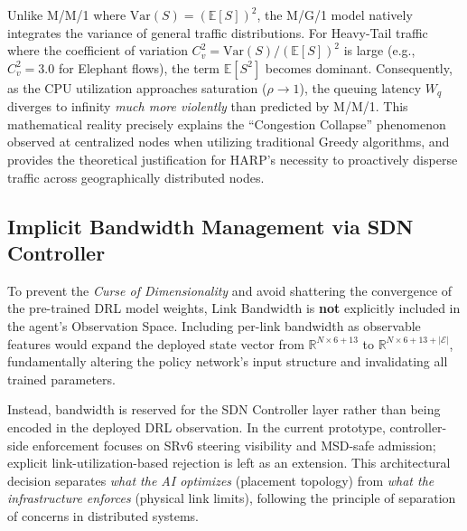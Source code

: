 \documentclass[12pt, a4paper, reqno, oneside]{book}
\begin{document}
Unlike M/M/1 where $\text{Var}(S) = (\mathbb{E}[S])^2$, the M/G/1 model natively integrates the variance of general traffic distributions. For Heavy-Tail traffic where the coefficient of variation $C_v^2 = \text{Var}(S)/(\mathbb{E}[S])^2$ is large (e.g., $C_v^2 = 3.0$ for Elephant flows), the term $\mathbb{E}[S^2]$ becomes dominant. Consequently, as the CPU utilization approaches saturation ($\rho \to 1$), the queuing latency $W_q$ diverges to infinity \textit{much more violently} than predicted by M/M/1. This mathematical reality precisely explains the ``Congestion Collapse'' phenomenon observed at centralized nodes when utilizing traditional Greedy algorithms, and provides the theoretical justification for HARP's necessity to proactively disperse traffic across geographically distributed nodes.

\subsection{Implicit Bandwidth Management via SDN Controller}
To prevent the \textit{Curse of Dimensionality} and avoid shattering the convergence of the pre-trained DRL model weights, Link Bandwidth is \textbf{not} explicitly included in the agent's Observation Space. Including per-link bandwidth as observable features would expand the deployed state vector from $\mathbb{R}^{N \times 6 + 13}$ to $\mathbb{R}^{N \times 6 + 13 + |\mathcal{E}|}$, fundamentally altering the policy network's input structure and invalidating all trained parameters.

Instead, bandwidth is reserved for the SDN Controller layer rather than being encoded in the deployed DRL observation. In the current prototype, controller-side enforcement focuses on SRv6 steering visibility and MSD-safe admission; explicit link-utilization-based rejection is left as an extension. This architectural decision separates \textit{what the AI optimizes} (placement topology) from \textit{what the infrastructure enforces} (physical link limits), following the principle of separation of concerns in distributed systems.
\end{document}
